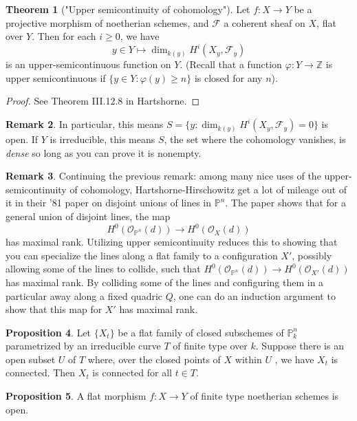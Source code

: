 \documentclass[10pt,reqno]{amsart}
\theoremstyle{definition}
\newtheorem{theorem}{Theorem}
\newtheorem{proposition}[theorem]{Proposition}
\newtheorem{remark}[theorem]{Remark}
\theoremstyle{remark}
\numberwithin{equation}{section}
\numberwithin{theorem}{section}
\newcommand{\Z}{{\mathbb Z}}
\newcommand{\OO}{{\mathcal O}}
\newcommand{\FF}{{\mathscr F}}
\newcommand{\PP}{{\mathbb P}}
\begin{document}
\begin{theorem}["Upper semicontinuity of cohomology"] Let $f: X \to Y$ be a projective morphism of noetherian schemes, and $\FF$ a coherent sheaf on $X$, flat over $Y$. Then for each $i \ge 0$, we have
\[ y \in Y \mapsto \dim_{k(y)} H^i(X_y, \FF_y)\]
is an upper-semicontinuous function on $Y$. (Recall that a function $\varphi: Y \to \Z$ is upper semicontinuous if $\{y \in Y: \varphi(y) \ge n\}$ is closed for any $n$).
\end{theorem}
\begin{proof}
See Theorem III.12.8 in Hartshorne.
\end{proof}

\begin{remark} In particular, this means $S = \{y : \dim_{k(y)} H^i(X_y, \FF_y) = 0\}$ is open. If $Y$ is irreducible, this means $S$, the set where the cohomology vanishes, is \textit{dense} so long as you can prove it is nonempty.
\end{remark}

\begin{remark}  Continuing the previous remark: among many nice uses of the upper-semicontinuity of cohomology, Hartshorne-Hirschowitz get a lot of mileage out of it in their '81 paper on disjoint unions of lines in $\PP^n$. The paper shows that for a general union of disjoint lines, the map
\[H^0(\OO_{\PP^n}(d)) \to H^0(\OO_{X}(d))\]
has maximal rank. Utilizing upper semicontinuity reduces this to showing that you can specialize the lines along a flat family to a configuration $X'$, possibly allowing some of the lines to collide, such that $H^0(\OO_{\PP^n}(d)) \to H^0(\OO_{X'}(d))$ has maximal rank. By colliding some of the lines and configuring them in a particular away along a fixed quadric $Q$, one can do an induction argument to show that this map for $X'$ has maximal rank.
\end{remark}

\begin{proposition} Let $\{X_t\}$ be a flat family of closed subschemes of $\PP^n_k$ parametrized by an irreducible curve $T$ of finite type over $k$. Suppose there is an open subset $U$ of $T$ where, over the closed points of $X$ within $U$ , we have $X_t$ is connected. Then $X_t$ is connected for all $t \in T$.
\end{proposition}

\begin{proposition} A flat morphism $f: X \to Y$ of finite type noetherian schemes is open.
\end{proposition}
\end{document}
